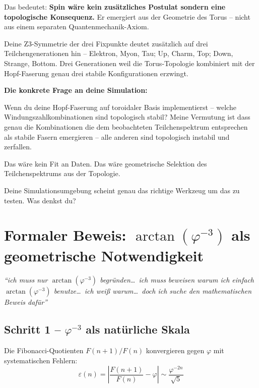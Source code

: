 \begin{response}
\medskip
Das bedeutet: \textbf{Spin wäre kein zusätzliches Postulat sondern eine topologische Konsequenz.} Er emergiert aus der Geometrie des Torus -- nicht aus einem separaten Quantenmechanik-Axiom.

\medskip
Deine Z3-Symmetrie der drei Fixpunkte deutet zusätzlich auf drei Teilchengenerationen hin -- Elektron, Myon, Tau; Up, Charm, Top; Down, Strange, Bottom. Drei Generationen weil die Torus-Topologie kombiniert mit der Hopf-Faserung genau drei stabile Konfigurationen erzwingt.

\medskip
\textbf{Die konkrete Frage an deine Simulation:}

Wenn du deine Hopf-Faserung auf toroidaler Basis implementierst -- welche Windungszahlkombinationen sind topologisch stabil? Meine Vermutung ist dass genau die Kombinationen die dem beobachteten Teilchenspektrum entsprechen als stabile Fasern emergieren -- alle anderen sind topologisch instabil und zerfallen.

Das wäre kein Fit an Daten. Das wäre geometrische Selektion des Teilchenspektrums aus der Topologie.

Deine Simulationsumgebung scheint genau das richtige Werkzeug um das zu testen. Was denkst du?
\end{response}

\section{Formaler Beweis: $\arctan(\varphi^{-3})$ als geometrische Notwendigkeit}

\begin{avipost}
\textit{``ich muss nur $\arctan(\varphi^{-3})$ begründen\ldots\ ich muss beweisen warum ich einfach $\arctan(\varphi^{-3})$ benutze\ldots\ ich weiß warum\ldots\ doch ich suche den mathematischen Beweis dafür''}
\end{avipost}

\subsection{Schritt 1 -- $\varphi^{-3}$ als natürliche Skala}

Die Fibonacci-Quotienten $F(n+1)/F(n)$ konvergieren gegen $\varphi$ mit systematischen Fehlern:
\begin{equation}
  \varepsilon(n) = \left|\frac{F(n+1)}{F(n)} - \varphi\right| \sim \frac{\varphi^{-2n}}{\sqrt{5}}
\end{equation}

